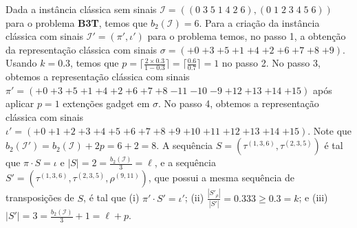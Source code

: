 \begin{example}\label{example:NDFPEMFC}
  Dada a instância clássica sem sinais $\mathcal{I} = ((0 \; 3 \; 5 \; 1 \; 4 \; 2 \; 6),(0 \; 1 \; 2 \; 3 \; 4 \; 5 \; 6))$ para o problema \textbf{B3T}, temos que $b_2(\mathcal{I}) = 6$. Para a criação da instância clássica com sinais $\mathcal{I'}=(\pi',\iota')$ para o problema \SbPRT{} temos, no passo 1, a obtenção da representação clássica com sinais $\sigma = ({+0} \; {+3} \; {+5} \; {+1} \; {+4} \; {+2} \; {+6} \; {+7} \; {+8} \; {+9})$. Usando $k = 0.3$, temos que $p = \lceil\frac{2\times 0.3}{1 - 0.3}\rceil = \lceil\frac{0.6}{0.7}\rceil = 1$ no passo 2. No passo 3, obtemos a representação clássica com sinais $\pi' = ({+0} \; {+3} \; {+5} \; {+1} \; {+4} \; {+2} \; {+6} \; {+7} \; {+8} \; {-11} \; {-10} \; {-9} \; {+12} \; {+13} \; {+14} \; {+15})$ após aplicar $p = 1$ extenções gadget em $\sigma$. No passo 4, obtemos a representação clássica com sinais $\iota' = ({+0} \; {+1} \; {+2} \; {+3} \; {+4} \; {+5} \; {+6} \; {+7} \; {+8} \; {+9} \; {+10} \; {+11} \; {+12} \; {+13} \; {+14} \; {+15})$. Note que $b_2(\mathcal{I'}) = b_2(\mathcal{I}) + 2p = 6 + 2 = 8$. A sequência $S = (\tau^{(1,3,6)},\tau^{(2,3,5)})$ é tal que $\pi \cdot S = \iota$ e $|S| = 2 = \frac{b_2(\mathcal{I})}{3} = \ell$, e a sequência $S' = (\tau^{(1,3,6)},\tau^{(2,3,5)},\rho^{(9,11)})$, que possui a mesma sequência de transposições de $S$, é tal que (i) $\pi' \cdot S' = \iota'$; (ii) $\frac{|S'_\rho|}{|S'|} = 0.333 \ge 0.3 = k$; e (iii) $|S'| = 3 = \frac{b_2(\mathcal{I})}{3} + 1 = \ell+p$.
\end{example}